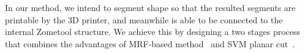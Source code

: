 In our method, we intend to segment shape so that the resulted segments are printable by the 3D printer, and meanwhile is able to be connected to the internal Zometool structure.
We achieve this by designing a two stages process that combines the advantages of MRF-based method~\cite{boykov:2004:experimental} and SVM planar cut~\cite{wang2016improved}.



